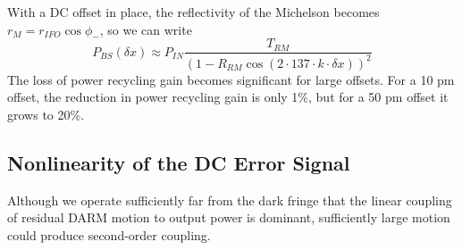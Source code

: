 With a DC offset in place, the reflectivity of the Michelson becomes $r_M = r_{IFO}\cos\phi_-$, so we can write
\begin{equation}
P_{BS}(\delta x) \approx P_{IN} 
\frac{T_{RM}}{\left(1 - R_{RM} \cos\left(2\cdot137\cdot k\cdot\delta x\right)\right)^2}
\end{equation}
The loss of power recycling gain becomes significant for large
offsets.  For a 10 pm offset, the reduction in power recycling gain is
only 1\%, but for a 50 pm offset it grows to 20\%.

\subsection{Nonlinearity of the DC Error Signal}

Although we operate sufficiently far from the dark fringe that the
linear coupling of residual DARM motion to output power is dominant,
sufficiently large motion could produce second-order coupling. 

